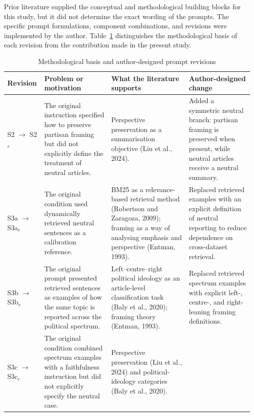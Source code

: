 
Prior literature supplied the conceptual and methodological building blocks for
this study, but it did not determine the exact wording of the prompts. The
specific prompt formulations, component combinations, and revisions were
implemented by the author. Table~\ref{tab:prompt-revision-logic} distinguishes
the methodological basis of each revision from the contribution made in the
present study.

\begin{table}[ht]
\centering
\small
\renewcommand{\arraystretch}{1.2}
\caption{Methodological basis and author-designed prompt revisions}
\label{tab:prompt-revision-logic}
\begin{tabularx}{\textwidth}{@{}p{}X X X@{}}
\toprule
Revision & Problem or motivation & What the literature supports & Author-designed change \\
\midrule
S2 $\rightarrow$ S2$_r$ &
The original instruction specified how to preserve partisan framing but did not explicitly define the treatment of neutral articles. &
Perspective preservation as a summarisation objective (Liu et al., 2024). &
Added a symmetric neutral branch: partisan framing is preserved when present, while neutral articles receive a neutral summary. \\
\addlinespace
S3a $\rightarrow$ S3a$_r$ &
The original condition used dynamically retrieved neutral sentences as a calibration reference. &
BM25 as a relevance-based retrieval method (Robertson and Zaragoza, 2009); framing as a way of analysing emphasis and perspective (Entman, 1993). &
Replaced retrieved examples with an explicit definition of neutral reporting to reduce dependence on cross-dataset retrieval. \\
\addlinespace
S3b $\rightarrow$ S3b$_r$ &
The original prompt presented retrieved sentences as examples of how the same topic is reported across the political spectrum. &
Left--centre--right political ideology as an article-level classification task (Baly et al., 2020); framing theory (Entman, 1993). &
Replaced retrieved spectrum examples with explicit left-, centre-, and right-leaning framing definitions. \\
\addlinespace
S3c $\rightarrow$ S3c$_r$ &
The original condition combined spectrum examples with a faithfulness instruction but did not explicitly specify the neutral case. &
Perspective preservation (Liu et al., 2024) and political-ideology categories (Baly et al., 2020). &

\end{tabularx}
\end{table}
